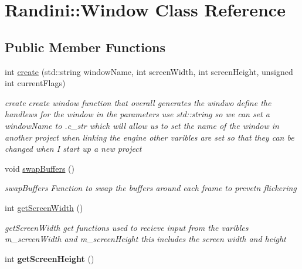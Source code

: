 \hypertarget{classRandini_1_1Window}{
\section{Randini::Window Class Reference}
\label{classRandini_1_1Window}
}
\subsection*{Public Member Functions}
\begin{DoxyCompactItemize}
\item 
int \hyperlink{classRandini_1_1Window_a74f33cf737af665902138f80cc779cb5}{create} (std::string windowName, int screenWidth, int screenHeight, unsigned int currentFlags)
\begin{DoxyCompactList}\small\item\em create create window function that overall generates the windwo define the handlews for the window in the parameters use std::string so we can set a windowName to .c\_\-str which will allow us to set the name of the window in another project when linking the engine other varibles are set so that they can be changed when I start up a new project \item\end{DoxyCompactList}\item 
\hypertarget{classRandini_1_1Window_af0fe0a4f666f5c946bb8df997977e40e}{
void \hyperlink{classRandini_1_1Window_af0fe0a4f666f5c946bb8df997977e40e}{swapBuffers} ()}
\label{classRandini_1_1Window_af0fe0a4f666f5c946bb8df997977e40e}

\begin{DoxyCompactList}\small\item\em swapBuffers Function to swap the buffers around each frame to prevetn flickering \item\end{DoxyCompactList}\item 
int \hyperlink{classRandini_1_1Window_a7b4ddf85609bbe27f2800ff05a0130dc}{getScreenWidth} ()
\begin{DoxyCompactList}\small\item\em getScreenWidth get functions used to recieve input from the varibles m\_\-screenWidth and m\_\-screenHeight this includes the screen width and height \item\end{DoxyCompactList}\item 
\hypertarget{classRandini_1_1Window_aedbf196a50a63cf91c8eedcc5d80e204}{
int {\bfseries getScreenHeight} ()}
\label{classRandini_1_1Window_aedbf196a50a63cf91c8eedcc5d80e204}

\end{DoxyCompactItemize}


